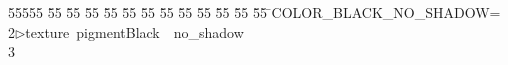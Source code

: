 %
%
\begin{tabbing}
55555 \= 55 \= 55 \= 55 \= 55 \= 55 \= 55 \= 55 \= 55 \= 55 \= 55 \= 55 \= 55 \= \>COLOR\_BLACK\_NO\_SHADOW=\\[0pt]
2\>$\triangleright$\>texture\ pigmentBlack\ \ no\_shadow\\[0pt]
3\>\end{tabbing}
